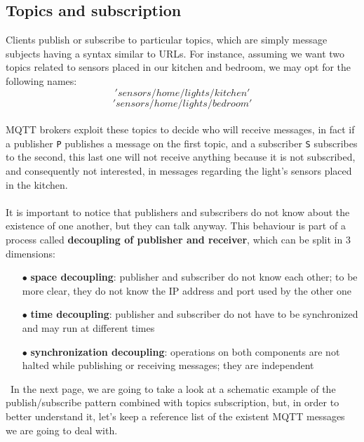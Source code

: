 \documentclass[12pt]{report}
\begin{document}
\subsection{Topics and subscription}
\bigskip
Clients publish or subscribe to particular topics, which are simply message subjects having a syntax similar to URLs. For instance, assuming we want two topics related to sensors placed in our kitchen and bedroom, we may opt for the following names: $$'sensors/home/lights/kitchen'$$ $$'sensors/home/lights/bedroom'$$\\
MQTT brokers exploit these topics to decide who will receive messages, in fact if a publisher \texttt{P} publishes a message on the first topic, and a subscriber \texttt{S} subscribes to the second, this last one will not receive anything because it is not subscribed, and consequently not interested, in messages regarding the light's sensors placed in the kitchen.\\\\ 
It is important to notice that publishers and subscribers do not know about the existence of one another, but they can talk anyway.
This behaviour is part of a process called \textbf{decoupling of publisher and receiver}, which can be split in 3 dimensions:

\begin{itemize}
  \setlength{\itemindent}{+4mm}
  \item[$\bullet$] \textbf{space decoupling}: publisher and subscriber do not know each other; to be more clear, they do not know the IP address and port used by the other one
  \item[$\bullet$] \textbf{time decoupling}: publisher and subscriber do not have to be synchronized and may run at different times
  \item[$\bullet$] \textbf{synchronization decoupling}: operations on both components are not halted while publishing or receiving messages; they are independent
\end{itemize}\
In the next page, we are going to take a look at a schematic  example of the publish/subscribe pattern combined with topics subscription, but, in order to better understand it, let's keep a reference list of the existent MQTT messages we are going to deal with.
\end{document}
